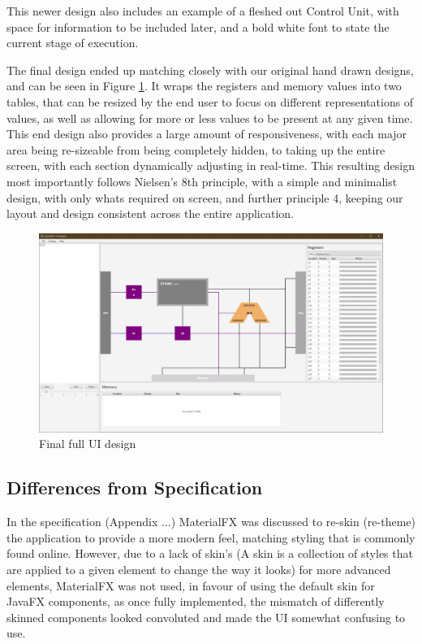 This newer design also includes an example of a fleshed out Control Unit, with space for information to be included later, and a bold white font to state the current stage of execution.

The final design ended up matching closely with our original hand drawn designs, and can be seen in Figure \ref{fig:final_implemented_design}. It wraps the registers and memory values into two tables, that can be resized by the end user to focus on different representations of values, as well as allowing for more or less values to be present at any given time. This end design also provides a large amount of responsiveness, with each major area being re-sizeable from being completely hidden, to taking up the entire screen, with each section dynamically adjusting in real-time. This resulting design most importantly follows Nielsen's 8th principle, with a simple and minimalist design, with only whats required on screen, and further principle 4, keeping our layout and design consistent across the entire application.

\begin{figure}[H]
    \centering
    \includegraphics[width=0.9\linewidth]{dissertation/DATA/final_design.jpg}
    \caption{Final full UI design}
    \label{fig:final_implemented_design}
\end{figure}

\subsection{Differences from Specification}
In the specification (Appendix ...) MaterialFX \cite{palexdev_2022_palexdevmaterialfx} was discussed to re-skin (re-theme) the application to provide a more modern feel, matching styling that is commonly found online. However, due to a lack of skin's (A skin is a collection of styles that are applied to a given element to change the way it looks) for more advanced elements, MaterialFX was not used, in favour of using the default skin for JavaFX components, as once fully implemented, the mismatch of differently skinned components looked convoluted and made the UI somewhat confusing to use.

